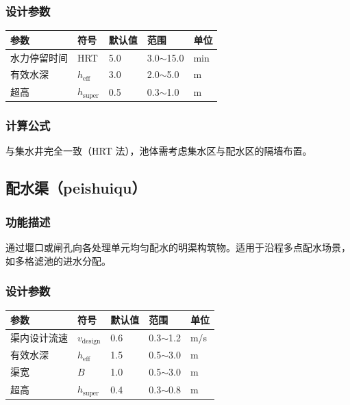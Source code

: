 \documentclass[12pt,a4paper]{ctexart}
\begin{document}
\subsubsection{设计参数}
\begin{table}[h]
\centering
\begin{tabular}{@{}lllll@{}}
\toprule
参数 & 符号 & 默认值 & 范围 & 单位 \\
\midrule
水力停留时间 & HRT & 5.0 & 3.0$\sim$15.0 & min \\
有效水深     & $h_{\text{eff}}$ & 3.0 & 2.0$\sim$5.0 & m \\
超高         & $h_{\text{super}}$ & 0.5 & 0.3$\sim$1.0 & m \\
\bottomrule
\end{tabular}
\end{table}

\subsubsection{计算公式}

与集水井完全一致（HRT 法），池体需考虑集水区与配水区的隔墙布置。

\subsection{配水渠（peishuiqu）}

\subsubsection{功能描述}
通过堰口或闸孔向各处理单元均匀配水的明渠构筑物。适用于沿程多点配水场景，如多格滤池的进水分配。

\subsubsection{设计参数}
\begin{table}[h]
\centering
\begin{tabular}{@{}lllll@{}}
\toprule
参数 & 符号 & 默认值 & 范围 & 单位 \\
\midrule
渠内设计流速 & $v_{\text{design}}$ & 0.6 & 0.3$\sim$1.2 & m/s \\
有效水深     & $h_{\text{eff}}$ & 1.5 & 0.5$\sim$3.0 & m \\
渠宽         & $B$ & 1.0 & 0.5$\sim$3.0 & m \\
超高         & $h_{\text{super}}$ & 0.4 & 0.3$\sim$0.8 & m \\
\bottomrule
\end{tabular}
\end{table}
\end{document}
